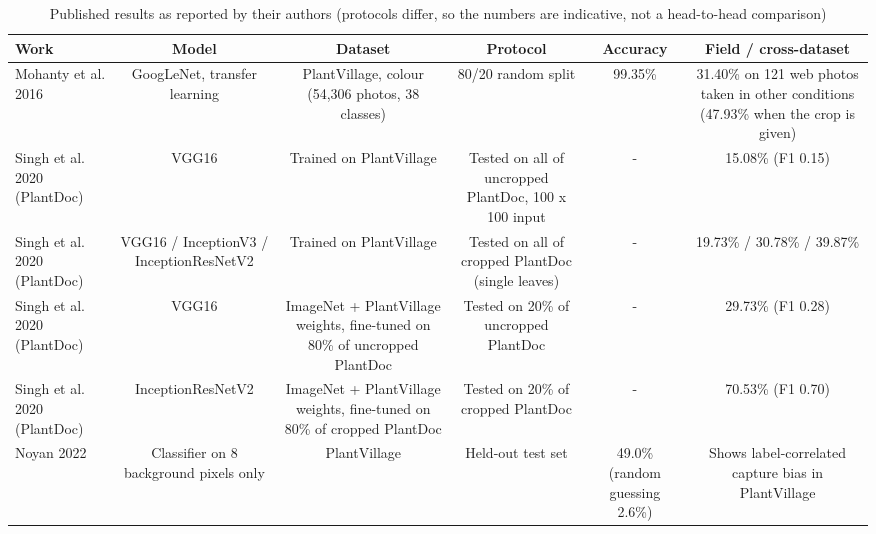 \begin{table}[t]
\centering
\small
\caption{Published results as reported by their authors (protocols differ, so the numbers are indicative, not a head-to-head comparison)}
\label{tab:table_literature}
\begin{tabular}{lccccc}
\toprule
Work & Model & Dataset & Protocol & Accuracy & Field / cross-dataset \\
\midrule
Mohanty et al. 2016 & GoogLeNet, transfer learning & PlantVillage, colour (54,306 photos, 38 classes) & 80/20 random split & 99.35\% & 31.40\% on 121 web photos taken in other conditions (47.93\% when the crop is given) \\
Singh et al. 2020 (PlantDoc) & VGG16 & Trained on PlantVillage & Tested on all of uncropped PlantDoc, 100 x 100 input & - & 15.08\% (F1 0.15) \\
Singh et al. 2020 (PlantDoc) & VGG16 / InceptionV3 / InceptionResNetV2 & Trained on PlantVillage & Tested on all of cropped PlantDoc (single leaves) & - & 19.73\% / 30.78\% / 39.87\% \\
Singh et al. 2020 (PlantDoc) & VGG16 & ImageNet + PlantVillage weights, fine-tuned on 80\% of uncropped PlantDoc & Tested on 20\% of uncropped PlantDoc & - & 29.73\% (F1 0.28) \\
Singh et al. 2020 (PlantDoc) & InceptionResNetV2 & ImageNet + PlantVillage weights, fine-tuned on 80\% of cropped PlantDoc & Tested on 20\% of cropped PlantDoc & - & 70.53\% (F1 0.70) \\
Noyan 2022 & Classifier on 8 background pixels only & PlantVillage & Held-out test set & 49.0\% (random guessing 2.6\%) & Shows label-correlated capture bias in PlantVillage \\
\bottomrule
\end{tabular}
\end{table}
